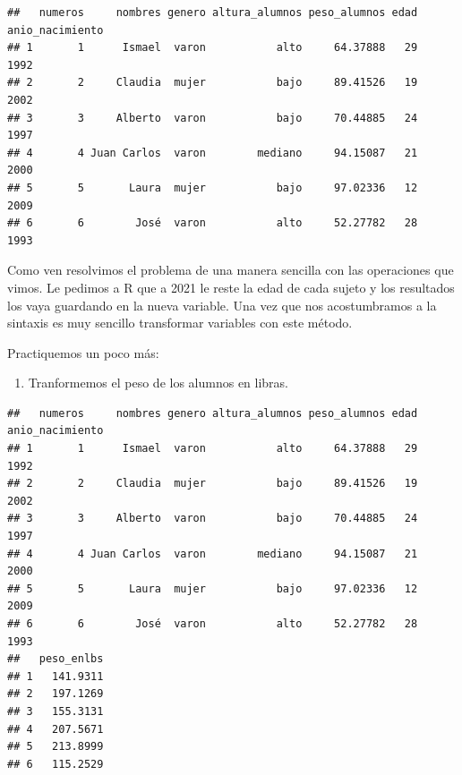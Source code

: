 \documentclass[
]{book}
\newenvironment{Shaded}{\begin{snugshade}}{\end{snugshade}}
\newcommand{\FloatTok}[1]{\textcolor[rgb]{0.00,0.00,0.81}{#1}}
\newcommand{\FunctionTok}[1]{\textcolor[rgb]{0.00,0.00,0.00}{#1}}
\newcommand{\NormalTok}[1]{#1}
\newcommand{\OtherTok}[1]{\textcolor[rgb]{0.56,0.35,0.01}{#1}}
\newcommand{\SpecialCharTok}[1]{\textcolor[rgb]{0.00,0.00,0.00}{#1}}
\providecommand{\tightlist}{%
  \setlength{\itemsep}{0pt}\setlength{\parskip}{0pt}}
\begin{document}
\begin{verbatim}
##   numeros     nombres genero altura_alumnos peso_alumnos edad anio_nacimiento
## 1       1      Ismael  varon           alto     64.37888   29            1992
## 2       2     Claudia  mujer           bajo     89.41526   19            2002
## 3       3     Alberto  varon           bajo     70.44885   24            1997
## 4       4 Juan Carlos  varon        mediano     94.15087   21            2000
## 5       5       Laura  mujer           bajo     97.02336   12            2009
## 6       6        José  varon           alto     52.27782   28            1993
\end{verbatim}

Como ven resolvimos el problema de una manera sencilla con las operaciones que vimos.
Le pedimos a R que a 2021 le reste la edad de cada sujeto y los resultados los vaya guardando en la nueva variable.
Una vez que nos acostumbramos a la sintaxis es muy sencillo transformar variables con este método.

Practiquemos un poco más:

\begin{enumerate}
\def\labelenumi{\arabic{enumi}.}
\setcounter{enumi}{1}
\tightlist
\item
  Tranformemos el peso de los alumnos en libras.
\end{enumerate}

\begin{Shaded}
\end{Shaded}

\begin{verbatim}
##   numeros     nombres genero altura_alumnos peso_alumnos edad anio_nacimiento
## 1       1      Ismael  varon           alto     64.37888   29            1992
## 2       2     Claudia  mujer           bajo     89.41526   19            2002
## 3       3     Alberto  varon           bajo     70.44885   24            1997
## 4       4 Juan Carlos  varon        mediano     94.15087   21            2000
## 5       5       Laura  mujer           bajo     97.02336   12            2009
## 6       6        José  varon           alto     52.27782   28            1993
##   peso_enlbs
## 1   141.9311
## 2   197.1269
## 3   155.3131
## 4   207.5671
## 5   213.8999
## 6   115.2529
\end{verbatim}
\end{document}
